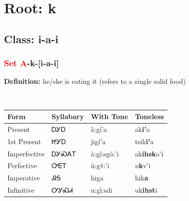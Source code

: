 \needspace{4in}
\section*{Root: k}
\nopagebreak
{}
\needspace{3in}
\subsection*{Class: i-a-i}
\nopagebreak
\needspace{2in}
\subsubsection*{\textcolor{Red}{Set A}{-}\textbf{k}{-}[i-a-i]}
\nopagebreak
\textbf{Definition: } he/she is eating it (refers to a single solid food)
\\[0.5em]
\begin{tabularx}{\textwidth}{l X X X}%
\toprule%
\textbf{Form}&\textbf{Syllabary}&\textbf{With Tone}&\textbf{Toneless}\\%
\midrule%
Present&ᎠᎩᎠ&à:gí’a&ak\textbf{i'}a\\%
1st Present&ᏥᎩᎠ&jigí’a&tsik\textbf{i'}a\\%
Imperfective&ᎠᎩᏍᎪᎢ&à:gî:sgó:’i&ak\textbf{ihsk}o'i\\%
Perfective&ᎤᎬᎢ&ù:gv̌:’i&u\textbf{k}v'i\\%
Imperative&ᎯᎦ&higa&hik\textbf{a}\\%
Infinitive&ᎤᎩᏍᏗ&u:gì:sdi&uk\textbf{ihst}i\\%
\bottomrule%
\end{tabularx}
\\[1em]